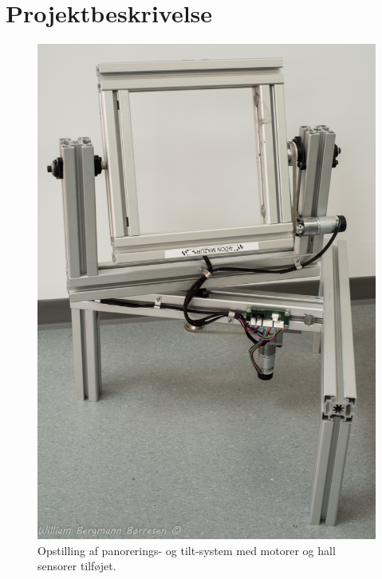 \section{Projektbeskrivelse}

\begin{figure}[H]
	\begin{center}
		\includegraphics[scale=0.15]{Billeder/opstilling.jpg}
		\caption{Opstilling af panorerings- og tilt-system med motorer og hall sensorer tilføjet.}
		\label{fig:Opstilling}
	\end{center}
\end{figure}


